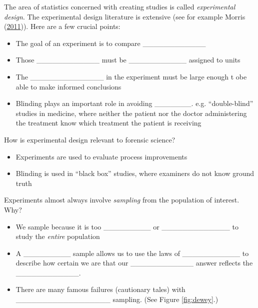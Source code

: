 \documentclass[]{book}
\providecommand{\tightlist}{%
  \setlength{\itemsep}{0pt}\setlength{\parskip}{0pt}}
\theoremstyle{definition}
\theoremstyle{definition}
\theoremstyle{remark}
\begin{document}
The area of statistics concerned with creating studies is called
\emph{experimental design}. The experimental design literature is
extensive (see for example Morris (\protect\hyperlink{ref-doe}{2011})).
Here are a few crucial points:

\begin{itemize}
\tightlist
\item
  The goal of an experiment is to compare \_\_\_\_\_\_\_\_\_\_\_\_
  \vspace{.1in}
\item
  Those \_\_\_\_\_\_\_\_\_\_\_\_ must be \_\_\_\_\_\_\_\_\_\_\_ assigned
  to units \vspace{.1in}
\item
  The \_\_\_\_\_\_\_\_\_\_\_\_\_\_ in the experiment must be large
  enough t obe able to make informed conclusions
\item
  Blinding plays an important role in avoiding \_\_\_\_\_\_\_. e.g.
  ``double-blind'' studies in medicine, where neither the patient nor
  the doctor administering the treatment know which treatment the
  patient is receiving
\end{itemize}

How is experimental design relevant to forensic science?

\begin{itemize}
\tightlist
\item
  Experiments are used to evaluate process improvements
\item
  Blinding is used in ``black box'' studies, where examiners do not know
  ground truth
\end{itemize}

Experiments almost always involve \emph{sampling} from the population of
interest. Why?

\begin{itemize}
\tightlist
\item
  We sample because it is too \_\_\_\_\_\_\_\_\_ or
  \_\_\_\_\_\_\_\_\_\_\_\_\_ to study the \emph{entire} population
  \vspace{.1in}
\item
  A \_\_\_\_\_\_\_\_\_ sample allows us to use the laws of
  \_\_\_\_\_\_\_\_\_\_\_ to describe how certain we are that our
  \_\_\_\_\_\_\_\_\_\_\_\_ answer reflects the \_\_\_\_\_\_\_\_\_\_\_\_.
\item
  There are many famous failures (cautionary tales) with
  \_\_\_\_\_\_\_\_\_\_\_\_\_\_\_\_\_\_ sampling. (See Figure
  \ref{fig:dewey}.)
\end{itemize}
\end{document}
